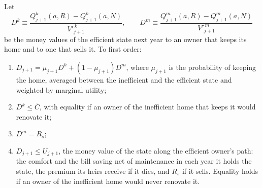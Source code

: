 \begin{lemma}[Matching]\label{lem:match}
Let
\begin{equation*}
  D^k\equiv\frac{Q^k_{j+1}(a,R)-Q^k_{j+1}(a,N)}{V'^{\,k}_{j+1}},
  \qquad
  D^m\equiv\frac{Q^m_{j+1}(a,R)-Q^m_{j+1}(a,N)}{V'^{\,m}_{j+1}}
\end{equation*}
be the money values of the efficient state next year to an owner that
keeps its home and to one that sells it. To first order:
\begin{enumerate}[label=(\roman*)]
\item $D_{j+1}=\mu_{j+1}D^k+(1-\mu_{j+1})D^m$, where $\mu_{j+1}$ is the
  probability of keeping the home, averaged between the inefficient and
  the efficient state and weighted by marginal utility;
\item $D^k\le\overline C$, with equality if an owner of the inefficient
  home that keeps it would renovate it;
\item $D^m=R_s$;
\item $D_{j+1}\le U_{j+1}$, the money value of the state along the
  efficient owner's path: the comfort and the bill saving net of
  maintenance in each year it holds the state, the premium its heirs
  receive if it dies, and $R_s$ if it sells. Equality holds if an owner of
  the inefficient home would never renovate it.
\end{enumerate}
\end{lemma}

